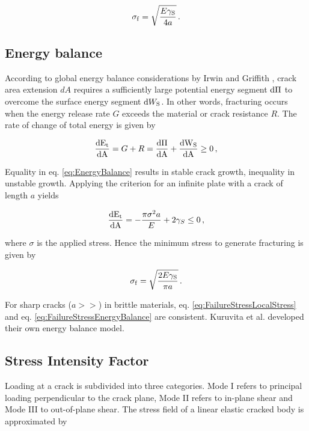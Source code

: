 \documentclass[format=acmtog, 12pt, screen=true, review=false]{acmart}
\begin{document}
\begin{equation}
    \label{eq:FailureStressLocalStress}
    \sigma_{\rm{f}}=\sqrt{\frac{E\gamma_{\rm{S}}}{4a}} \,.
\end{equation}

\subsection{Energy balance}

According to global energy balance considerations by Irwin and Griffith \cite{Sch12, And05}, crack area extension $dA$ requires a sufficiently large potential energy segment ${\rm{d}}\Pi$ to overcome the surface energy segment ${\rm{d}}W_{\rm{S}}$. In other words, fracturing occurs when the energy release rate $G$ exceeds the material or crack resistance $R$. The rate of change of total energy is given by

\begin{equation}
    \label{eq:EnergyBalance}
    \frac{\rm{d}E_{\rm{t}}}{\rm{d}A}=G+R=\frac{\rm{d}\Pi}{\rm{d}A}+\frac{\rm{d}W_{\rm{S}}}{\rm{d}A}\geq0\,,
\end{equation}

Equality in eq. \ref{eq:EnergyBalance} results in stable crack growth, inequality in unstable growth. Applying the criterion for an infinite plate with a crack of length $a$ yields

\begin{equation}
\frac{\rm{d}E_{\rm{t}}}{\rm{d}A}=-\frac{\pi\sigma^2a}{E}+2\gamma_S\leq0\,,
\end{equation}

where $\sigma$ is the applied stress. Hence the minimum stress to generate fracturing is given by

\begin{equation}
    \label{eq:FailureStressEnergyBalance}
    \sigma_{\rm{f}} = \sqrt{\frac{2E\gamma_{\rm{S}}}{\pi a}}\,.
\end{equation}

For sharp cracks ($a>>$) in brittle materials, eq. \ref{eq:FailureStressLocalStress} and eq. \ref{eq:FailureStressEnergyBalance} are consistent. Kuruvita et al. \cite{Kur14} developed their own energy balance model.

\subsection{Stress Intensity Factor}

Loading at a crack is subdivided into three categories. Mode I refers to principal loading perpendicular to the crack plane, Mode II refers to in-plane shear and Mode III to out-of-plane shear. The stress field of a linear elastic cracked body is approximated by
\end{document}
